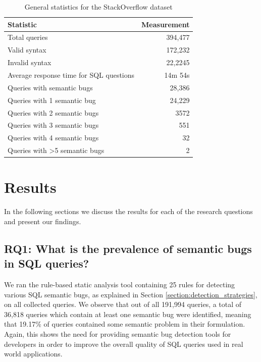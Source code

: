 \begin{table}[ht]
\centering
\begin{tabular}{@{}lr@{}}
\toprule
\textbf{Statistic}                         & \textbf{Measurement} \\ \midrule
Total queries                              & 394,477         \\
Valid syntax                               & 172,232         \\
Invalid syntax                             & 22,2245         \\
Average response time for SQL questions    & 14m 54s        \\
Queries with semantic bugs                 & 28,386          \\
Queries with 1 semantic bug                & 24,229          \\
Queries with 2 semantic bugs               & 3572           \\
Queries with 3 semantic bugs               & 551            \\
Queries with 4 semantic bugs               & 32             \\
Queries with \textgreater{}5 semantic bugs & 2              \\ \bottomrule
\end{tabular}
\caption{General statistics for the StackOverflow dataset}
\label{table:stackoverflow_stats}
\end{table}

\section{Results}
\label{section:results}
In the following sections we discuss the results for each of the research questions and present our findings.

\subsection{RQ1: What is the prevalence of semantic bugs in SQL queries?}

We ran the rule-based static analysis tool containing 25 rules for detecting various SQL semantic bugs, as explained in Section \ref{section:detection_strategies}, on all collected queries. We observe that out of all 191,994 queries, a total of 36,818 queries which contain at least one semantic bug were identified, meaning that 19.17\% of queries contained some semantic problem in their formulation. Again, this shows the need for providing semantic bug detection tools for developers in order to improve the overall quality of SQL queries used in real world applications.


